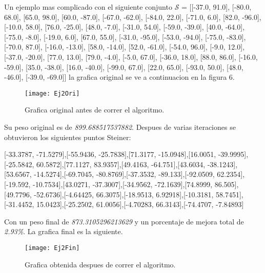 \documentclass[11pt,letterpaper]{article}
\begin{document}
Un ejemplo mas complicado con el siguiente conjunto $\mathcal{S}$ = [[-37.0, 91.0], [-80.0, 68.0], [65.0, 98.0], [60.0, -87.0], [-67.0, -62.0], [-84.0, 22.0], [-71.0, 6.0], [82.0, -96.0], [-10.0, 58.0], [76.0, -25.0], [48.0, -7.0], [-31.0, 54.0], [-59.0, -39.0], [40.0, -64.0], [-75.0, -8.0], [-19.0, 6.0], [67.0, 55.0], [-31.0, -95.0], [-53.0, -94.0], [-75.0, -83.0], [-70.0, 87.0], [-16.0, -13.0], [58.0, -14.0], [52.0, -61.0], [-54.0, 96.0], [-9.0, 12.0], [-37.0, -20.0], [77.0, 13.0], [79.0, -4.0], [-5.0, 67.0], [-36.0, 18.0], [88.0, 86.0], [-16.0, -59.0], [35.0, -38.0], [16.0, -40.0], [-99.0, 67.0], [22.0, 65.0], [-93.0, 50.0], [48.0, -46.0], [-39.0, -69.0]] la grafica original se ve a continuacion en la figura 6.
\begin{figure}[h!]
	\centering
	\texttt{[image: Ej2Ori]}
	\caption{Grafica original antes de correr el algoritmo.}
	\label{fig:ej2ori}
\end{figure}

Su peso original es de \emph{899.688517537882}. Despues de varias iteraciones se obtuvieron los siguientes puntos Steiner:

\begin{center}
	[-33.3787, -71.5279],[-55.9436, -25.7838],[71.3177, -15.0948],[16.0051, -39.9995],[-25.5842, 60.5872],[77.1127, 83.9357],[49.4163, -64.751],[43.6034, -38.1243],[53.6567, -14.5274],[-69.7045, -80.8769],[-37.3532, -89.133],[-92.0509, 62.2354],[-19.592, -10.7534],[43.0271, -37.3007],[-34.9562, -72.1639],[74.8999, 86.505],[49.7796, -52.6736],[-4.64425, 66.3075],[-18.9513, 6.92918],[-10.3181, 58.7451],[-31.4452, 15.0423],[-25.2502, 61.0056],[-4.70283, 66.3143],[-74.4707, -7.84893]
\end{center}

Con un peso final de \emph{873.3105296213629} y un porcentaje de mejora total de \emph{2.93\%}. La grafica final es la siguiente.

\begin{figure}[h!]
	\centering
	\texttt{[image: Ej2Fin]}
	\caption{Grafica obtenida despues de correr el algoritmo.}
	\label{fig:ej2fin}
\end{figure}
\end{document}
